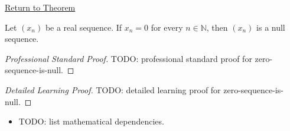 \newpage
{}
\label{prf:zero-sequence-is-null}

\begin{remark*}[Return]
\hyperref[thm:zero-sequence-is-null]{Return to Theorem}
\end{remark*}

\begin{theorem*}
Let $(x_n)$ be a real sequence. If $x_n = 0$ for every $n \in \mathbb{N}$,
then $(x_n)$ is a null sequence.

\smallskip
\noindent
\end{theorem*}

\begin{proof}[Professional Standard Proof]
\LRAProofBodyStart
TODO: professional standard proof for zero-sequence-is-null.
\end{proof}

\begin{proof}[Detailed Learning Proof]
\LRAProofBodyStart
TODO: detailed learning proof for zero-sequence-is-null.
\end{proof}

\begin{remark*}
\end{remark*}

\begin{dependencies}
\begin{itemize}
  \item TODO: list mathematical dependencies.
\end{itemize}
\end{dependencies}

\clearpage
